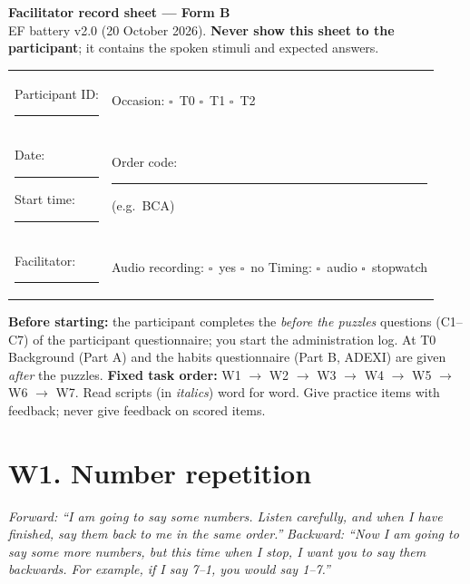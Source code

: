 \documentclass[10pt,a4paper]{article}
\newcommand{\blank}[1][1.2cm]{\rule{#1}{0.4pt}}
\newcommand{\bx}{$\square$}
\begin{document}
\begin{center}{\LARGE\bfseries Facilitator record sheet --- Form B}\\[3pt]
{\small EF battery v2.0 (20 October 2026). \textbf{Never show this sheet to the participant}; it contains the spoken stimuli and expected answers.}\end{center}
\begin{tabular}{@{}p{8cm}p{8cm}@{}}
Participant ID: \blank[4cm] & Occasion: \bx\ T0 \quad \bx\ T1 \quad \bx\ T2\\
Date: \blank[4cm] \quad Start time: \blank[2cm] & Order code: \blank[2cm] (e.g.\ BCA)\\
Facilitator: \blank[4cm] & Audio recording: \bx\ yes \quad \bx\ no \quad Timing: \bx\ audio \bx\ stopwatch\\
\end{tabular}

\textbf{Before starting:} the participant completes the \emph{before the puzzles} questions (C1--C7) of the participant questionnaire; you start the administration log. At T0 Background (Part A) and the habits questionnaire (Part B, ADEXI) are given \emph{after} the puzzles.
\textbf{Fixed task order:} W1 $\rightarrow$ W2 $\rightarrow$ W3 $\rightarrow$ W4 $\rightarrow$ W5 $\rightarrow$ W6 $\rightarrow$ W7. Read scripts (in \textit{italics}) word for word. Give practice items with feedback; never give feedback on scored items.

\section*{W1. Number repetition}
\textit{Forward: ``I am going to say some numbers. Listen carefully, and when I have finished, say them back to me in the same order.''}
\textit{Backward: ``Now I am going to say some more numbers, but this time when I stop, I want you to say them backwards. For example, if I say 7--1, you would say 1--7.''}
\end{document}
